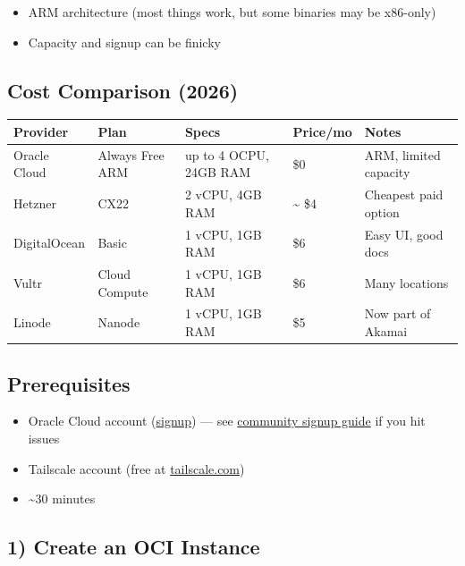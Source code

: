 \begin{itemize}
  \item ARM architecture (most things work, but some binaries may be x86-only)
  \item Capacity and signup can be finicky
\end{itemize}


\subsection{Cost Comparison (2026)}



\begin{table}[h]
\centering
\small
\begin{tabular}{|l|l|l|l|l|}
\hline
Provider & Plan & Specs & Price/mo & Notes \\
\hline
Oracle Cloud & Always Free ARM & up to 4 OCPU, 24GB RAM & \$0 & ARM, limited capacity \\
\hline
Hetzner & CX22 & 2 vCPU, 4GB RAM & \textasciitilde{} \$4 & Cheapest paid option \\
\hline
DigitalOcean & Basic & 1 vCPU, 1GB RAM & \$6 & Easy UI, good docs \\
\hline
Vultr & Cloud Compute & 1 vCPU, 1GB RAM & \$6 & Many locations \\
\hline
Linode & Nanode & 1 vCPU, 1GB RAM & \$5 & Now part of Akamai \\
\hline
\end{tabular}
\end{table}



\hrulefill


\subsection{Prerequisites}


\begin{itemize}
  \item Oracle Cloud account (\href{https://www.oracle.com/cloud/free/}{signup}) — see \href{https://gist.github.com/rssnyder/51e3cfedd730e7dd5f4a816143b25dbd}{community signup guide} if you hit issues
  \item Tailscale account (free at \href{https://tailscale.com}{tailscale.com})
  \item \textasciitilde{}30 minutes
\end{itemize}


\subsection{1) Create an OCI Instance}


